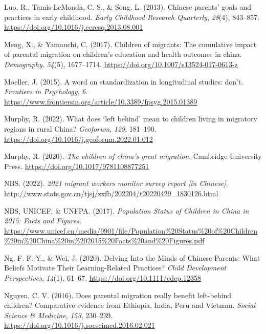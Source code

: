 \documentclass[
  man,floatsintext]{apa7}
\newlength{\cslhangindent}
\newlength{\cslentryspacingunit} %
\newenvironment{CSLReferences}[2] %
 {%
  \setlength{\parindent}{0pt}
  \ifodd #1
  \let\oldpar\par
  \def\par{\hangindent=\cslhangindent\oldpar}
  \fi
  \setlength{\parskip}{#2\cslentryspacingunit}
 }%
 {}
\begin{document}
\begin{CSLReferences}{1}{0}
\leavevmode{}%
Luo, R., Tamis-LeMonda, C. S., \& Song, L. (2013). Chinese parents{'} goals and practices in early childhood. \emph{Early Childhood Research Quarterly}, \emph{28}(4), 843--857. \url{https://doi.org/10.1016/j.ecresq.2013.08.001}

\leavevmode{}%
Meng, X., \& Yamauchi, C. (2017). Children of migrants: The cumulative impact of parental migration on children{'}s education and health outcomes in china. \emph{Demography}, \emph{54}(5), 1677--1714. \url{https://doi.org/10.1007/s13524-017-0613-z}

\leavevmode{}%
Moeller, J. (2015). A word on standardization in longitudinal studies: don't. \emph{Frontiers in Psychology}, \emph{6}. \url{https://www.frontiersin.org/article/10.3389/fpsyg.2015.01389}

\leavevmode{}%
Murphy, R. (2022). What does {`}left behind{'} mean to children living in migratory regions in rural China? \emph{Geoforum}, \emph{129}, 181--190. \url{https://doi.org/10.1016/j.geoforum.2022.01.012}

\leavevmode{}%
Murphy, R. (2020). \emph{The children of china{'}s great migration}. Cambridge University Press. \url{https://doi.org/10.1017/9781108877251}

\leavevmode{}%
NBS. (2022). \emph{2021 migrant workers monitor survey report {[}in Chinese{]}}. \url{http://www.stats.gov.cn/tjsj/zxfb/202204/t20220429_1830126.html}

\leavevmode{}%
NBS, UNICEF, \& UNFPA. (2017). \emph{Population Status of Children in China in 2015: Facts and Figures}. \url{https://www.unicef.cn/media/9901/file/Population\%20Status\%20of\%20Children\%20in\%20China\%20in\%202015\%20Facts\%20and\%20Figures.pdf}

\leavevmode{}%
Ng, F. F.-Y., \& Wei, J. (2020). Delving Into the Minds of Chinese Parents: What Beliefs Motivate Their Learning-Related Practices? \emph{Child Development Perspectives}, \emph{14}(1), 61--67. \url{https://doi.org/10.1111/cdep.12358}

\leavevmode{}%
Nguyen, C. V. (2016). Does parental migration really benefit left-behind children? Comparative evidence from Ethiopia, India, Peru and Vietnam. \emph{Social Science \& Medicine}, \emph{153}, 230--239. \url{https://doi.org/10.1016/j.socscimed.2016.02.021}


\end{CSLReferences}
\end{document}

